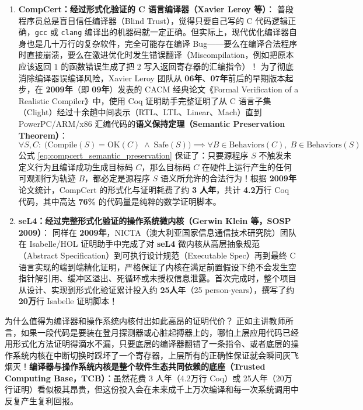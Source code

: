\documentclass[a4paper]{article}
\begin{document}
\begin{enumerate}
    \item \textbf{CompCert：经过形式化验证的 C 语言编译器（Xavier Leroy 等）}：
    普段程序员总是盲目信任编译器（Blind Trust），觉得只要自己写的 C 代码逻辑正确，\texttt{gcc} 或 \texttt{clang} 编译出的机器码就一定正确。但实际上，现代优化编译器自身也是几十万行的复杂软件，完全可能存在编译 Bug——要么在编译合法程序时直接崩溃，要么在激进优化时发生错误翻译（Miscompilation，例如把原本应该返回 $1$ 的函数错误生成了把 $2$ 写入返回寄存器的汇编指令）！
    为了彻底消除编译器误编译风险，Xavier Leroy 团队从 \textbf{06年}、\textbf{07年}前后的早期版本起步，在 \textbf{2009年}（即 \textbf{09年}）发表的 CACM 经典论文《Formal Verification of a Realistic Compiler》中，使用 Coq 证明助手完整证明了从 C 语言子集（Clight）经过十余趟中间表示（RTL、LTL、Linear、Mach）直到 PowerPC/ARM/x86 汇编代码的\textbf{语义保持定理（Semantic Preservation Theorem）}：
    \begin{equation}
    \forall S, C:\; \big(\mathrm{Compile}(S) = \mathrm{OK}(C) \;\land\; \mathrm{Safe}(S)\big) \implies \forall B \in \mathrm{Behaviors}(C),\; B \in \mathrm{Behaviors}(S)
    \label{eq:compcert_semantic_preservation}
    \end{equation}
    公式 \eqref{eq:compcert_semantic_preservation} 保证了：只要源程序 $S$ 不触发未定义行为且编译成功生成目标码 $C$，那么目标码 $C$ 在硬件上运行产生的任何可观测行为轨迹 $B$，都必定是源程序 $S$ 语义所允许的合法行为！根据 \textbf{2009年}论文统计，CompCert 的形式化与证明耗费了约 \textbf{3 人年}，共计 \textbf{4.2万}行 Coq 代码，其中高达 \textbf{76\%} 的代码量是纯粹的数学证明脚本。
    \item \textbf{seL4：经过完整形式化验证的操作系统微内核（Gerwin Klein 等，SOSP 2009）}：
    同样在 \textbf{2009年}，NICTA（澳大利亚国家信息通信技术研究院）团队在 Isabelle/HOL 证明助手中完成了对 \textbf{seL4} 微内核从高层抽象规范（Abstract Specification）到可执行设计规范（Executable Spec）再到最终 C 语言实现的端到端精化证明，严格保证了内核在满足前置假设下绝不会发生空指针解引用、缓冲区溢出、死循环或未授权信息泄露。首次完成时，整个项目从设计、实现到形式化验证累计投入约 \textbf{25人}年（25 person-years），撰写了约 \textbf{20万}行 Isabelle 证明脚本！
\end{enumerate}

\begin{importantbox}{为什么值得为编译器和操作系统内核付出如此高昂的证明代价？}
正如主讲教师所言，如果一段代码是要装在登月探测器或心脏起搏器上的，哪怕上层应用代码已经用形式化方法证明得滴水不漏，只要底层的编译器翻错了一条指令、或者底层的操作系统内核在中断切换时踩坏了一个寄存器，上层所有的正确性保证就会瞬间灰飞烟灭！\textbf{编译器与操作系统内核是整个软件生态共同依赖的底座（Trusted Computing Base，TCB）}：虽然花费 3 人年（4.2万行 Coq）或 25人年（20万行证明）看似极其昂贵，但这份投入会在未来成千上万次编译和每一次系统调用中反复产生复利回报。
\end{importantbox}
\end{document}
